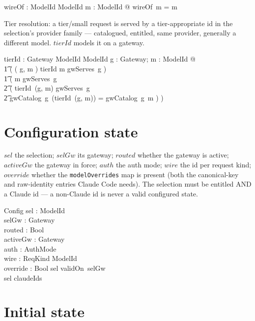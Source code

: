 \documentclass{article}
\begin{document}
\begin{axdef}
  wireOf : ModelId \fun ModelId
\where
  \forall m : ModelId @ wireOf~m = m
\end{axdef}

Tier resolution: a tier/small request is served by a tier-appropriate id in the
selection's provider family --- catalogued, entitled, same provider, generally a
different model. $tierId$ models it on a gateway.

\begin{axdef}
  tierId : Gateway \cross ModelId \pfun ModelId
\where
  \forall g : Gateway; m : ModelId @ \\
  \t1 ( ( g, m ) \in \dom tierId \iff m \in gwServes~g ) \land \\
  \t1 ( m \in gwServes~g \implies \\
  \t2   ( tierId~(g, m) \in gwServes~g \land \\
  \t2     gwCatalog~g~(tierId~(g, m)) = gwCatalog~g~m ) )
\end{axdef}

\section{Configuration state}

$sel$ the selection; $selGw$ its gateway; $routed$ whether the gateway is active;
$activeGw$ the gateway in force; $auth$ the auth mode; $wire$ the id per request
kind; $override$ whether the \texttt{modelOverrides} map is present (both the
canonical-key and raw-identity entries Claude Code needs). The selection must be
entitled AND a Claude id --- a non-Claude id is never a valid configured state.

\begin{schema}{Config}
  sel : ModelId \\
  selGw : Gateway \\
  routed : Bool \\
  activeGw : Gateway \\
  auth : AuthMode \\
  wire : ReqKind \pfun ModelId \\
  override : Bool
\where
  sel \in validOn~selGw \\
  sel \in claudeIds
\end{schema}

\section{Initial state}
\end{document}
